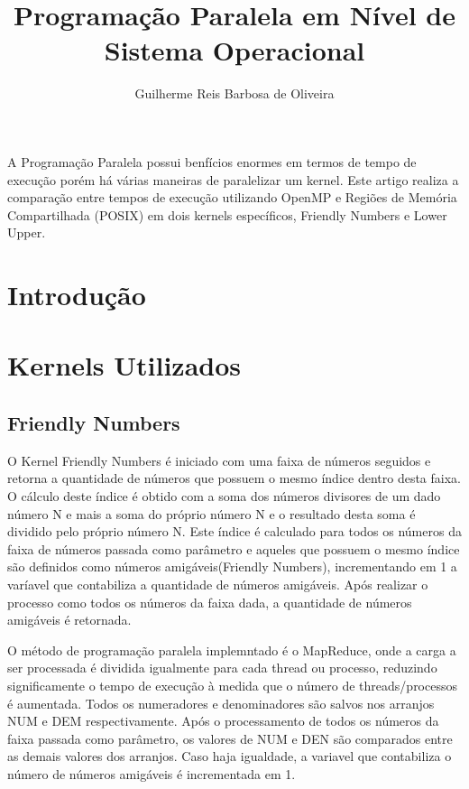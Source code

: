 \documentclass[12pt]{article}
\title{Programação Paralela em Nível de Sistema Operacional}
\author{Guilherme Reis Barbosa de Oliveira\inst{1}}
\begin{document}
 

\maketitle

\begin{abstract}
  
\end{abstract}
     
\begin{resumo} 
  A Programação Paralela possui benfícios enormes em termos de tempo de execução porém há várias maneiras de 
  paralelizar um kernel. Este artigo realiza a comparação entre tempos de execução utilizando OpenMP e Regiões de Memória
  Compartilhada (POSIX) em dois kernels específicos, Friendly Numbers e Lower Upper. 
\end{resumo}


\section{Introdução}


\section{Kernels Utilizados}
\subsection{Friendly Numbers}

O Kernel Friendly Numbers é iniciado com uma faixa de números seguidos e retorna a quantidade de números que possuem o mesmo índice dentro desta faixa. O cálculo deste índice é obtido com a soma dos números divisores de um dado número N e mais a soma do próprio número N e o resultado desta soma é dividido pelo próprio número N. Este índice é calculado para todos os números da faixa de números passada como parâmetro e aqueles que possuem o mesmo índice são definidos como números amigáveis(Friendly Numbers), incrementando em 1 a varíavel que contabiliza a quantidade de números amigáveis. Após realizar o processo como todos os números da faixa dada, a quantidade de números amigáveis é retornada. 




O método de programação paralela implemntado é o MapReduce, onde a carga a ser processada é dividida igualmente para cada thread ou processo, reduzindo significamente o tempo de execução à medida que o número de threads/processos é aumentada. Todos os numeradores e denominadores são salvos nos arranjos NUM e DEM respectivamente. Após o processamento de todos os números da faixa passada como parâmetro,
os valores de NUM e DEN são comparados entre as demais valores dos arranjos. Caso haja igualdade, a variavel que contabiliza o número de números amigáveis é incrementada em 1.
\end{document}
